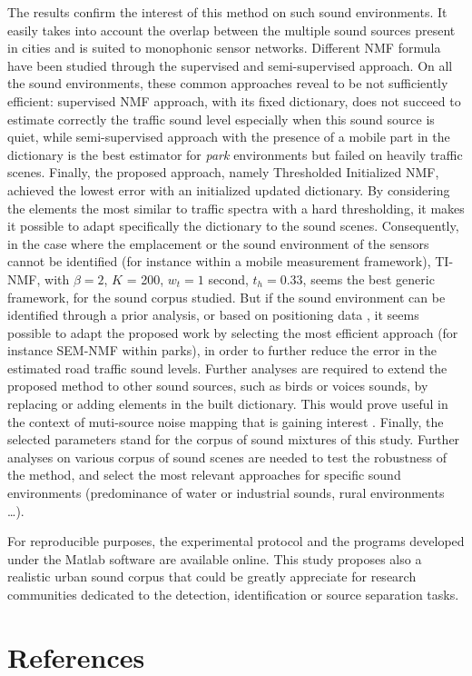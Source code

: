 \documentclass[review,5p,twocolumn,sort&compress,times]{elsarticle}
\begin{document}
The results confirm the interest of this method on such sound environments. It easily takes into account the overlap between the multiple sound sources present in cities and is suited to monophonic sensor networks. Different NMF formula have been studied through the supervised and semi-supervised approach. On all the sound environments, these common approaches reveal to be not sufficiently efficient: supervised NMF approach, with its fixed dictionary, does not succeed to estimate correctly the traffic sound level especially when this sound source is quiet, while semi-supervised approach with the presence of a mobile part in the dictionary is the best estimator for \textit{park} environments but failed on heavily traffic scenes. Finally, the proposed approach, namely Thresholded Initialized NMF, achieved the lowest error with an initialized updated dictionary. By considering the elements the most similar to traffic spectra with a hard thresholding, it makes it possible to adapt specifically the dictionary to the sound scenes. Consequently, in the case where the emplacement or the sound environment of the sensors cannot be identified (for instance within a mobile measurement framework), TI-NMF, with $\beta = 2$, $K$ = 200, $w_t = 1$ second, $t_{h} = 0.33$, seems the best generic framework, for the sound corpus studied. But if the sound environment can be identified through a prior analysis, or based on positioning data \cite{can2015noise,lavandier2016urban}, it seems possible to adapt the proposed work by selecting the most efficient approach (for instance SEM-NMF within parks), in order to further reduce the error in the estimated road traffic sound levels.
Further analyses are required to extend the proposed method to other sound sources, such as birds or voices sounds, by replacing or adding elements in the built dictionary. This would prove useful in the context of muti-source noise mapping that is  gaining interest \cite{aumond2017Probabilistic, aletta2015soundscape}. Finally, the selected parameters stand for the corpus of sound mixtures of this study. Further analyses on various corpus of sound scenes are needed to test the robustness of the method, and select the most relevant approaches for specific sound environments (predominance of water or industrial sounds, rural environments \dots).

For reproducible purposes, the experimental protocol and the programs developed under the Matlab software are available online. This study proposes also a realistic urban sound corpus that could be greatly appreciate for research communities dedicated to the detection, identification or source separation tasks.


\section*{References}


\end{document}
